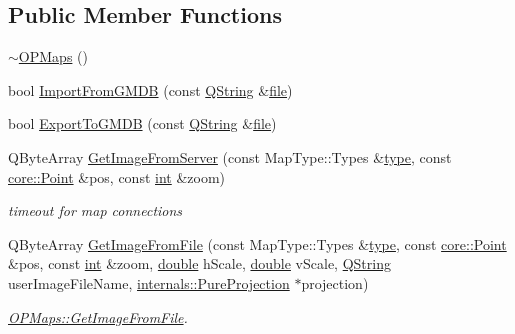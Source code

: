 \subsection*{Public Member Functions}
\begin{DoxyCompactItemize}
\item 
\hyperlink{group___o_p_map_widget_ga7f09b75dc945740e40b6c0fa28998c51}{$\sim$\-O\-P\-Maps} ()
\item 
bool \hyperlink{group___o_p_map_widget_ga50b468c09bac4de46905661839aa2477}{Import\-From\-G\-M\-D\-B} (const \hyperlink{group___u_a_v_objects_plugin_gab9d252f49c333c94a72f97ce3105a32d}{Q\-String} \&\hyperlink{uavobjecttemplate_8m_a97c04efa65bcf0928abf9260bc5cbf46}{file})
\item 
bool \hyperlink{group___o_p_map_widget_ga0e08ede04e7f73ba867d870516a3da12}{Export\-To\-G\-M\-D\-B} (const \hyperlink{group___u_a_v_objects_plugin_gab9d252f49c333c94a72f97ce3105a32d}{Q\-String} \&\hyperlink{uavobjecttemplate_8m_a97c04efa65bcf0928abf9260bc5cbf46}{file})
\item 
Q\-Byte\-Array \hyperlink{group___o_p_map_widget_ga03e1a814248920f31520f38e2ed5d412}{Get\-Image\-From\-Server} (const Map\-Type\-::\-Types \&\hyperlink{glext_8h_a7d05960f4f1c1b11f3177dc963a45d86}{type}, const \hyperlink{structcore_1_1_point}{core\-::\-Point} \&pos, const \hyperlink{ioapi_8h_a787fa3cf048117ba7123753c1e74fcd6}{int} \&zoom)
\begin{DoxyCompactList}\small\item\em timeout for map connections \end{DoxyCompactList}\item 
Q\-Byte\-Array \hyperlink{group___o_p_map_widget_gae60565be4288e3fca3f28642b38d93ea}{Get\-Image\-From\-File} (const Map\-Type\-::\-Types \&\hyperlink{glext_8h_a7d05960f4f1c1b11f3177dc963a45d86}{type}, const \hyperlink{structcore_1_1_point}{core\-::\-Point} \&pos, const \hyperlink{ioapi_8h_a787fa3cf048117ba7123753c1e74fcd6}{int} \&zoom, \hyperlink{_super_l_u_support_8h_a8956b2b9f49bf918deed98379d159ca7}{double} h\-Scale, \hyperlink{_super_l_u_support_8h_a8956b2b9f49bf918deed98379d159ca7}{double} v\-Scale, \hyperlink{group___u_a_v_objects_plugin_gab9d252f49c333c94a72f97ce3105a32d}{Q\-String} user\-Image\-File\-Name, \hyperlink{classinternals_1_1_pure_projection}{internals\-::\-Pure\-Projection} $\ast$projection)
\begin{DoxyCompactList}\small\item\em \hyperlink{group___o_p_map_widget_gae60565be4288e3fca3f28642b38d93ea}{O\-P\-Maps\-::\-Get\-Image\-From\-File}. \end{DoxyCompactList}\item 

\end{DoxyCompactItemize}
